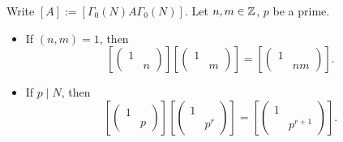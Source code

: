 \begin{proposition}\label{multiplication formula for diag (1 n)}
    Write $[A] := [\Gamma_0(N) A\Gamma_0(N)]$. Let $n, m\in\mathbb{Z}$, $p$ be a prime.
    \begin{itemize}
        \item If $(n, m) = 1$, then \[\left[ \begin{pmatrix}
            1&\\ & n
        \end{pmatrix} \right]\left[ \begin{pmatrix}
            1&\\ & m
        \end{pmatrix} \right] = \left[ \begin{pmatrix}
            1&\\ & nm
        \end{pmatrix} \right].\]
        \item If $p\mid N$, then
        \[\left[ \begin{pmatrix}
            1&\\ & p
        \end{pmatrix} \right]\left[ \begin{pmatrix}
            1&\\ & p^r
        \end{pmatrix} \right] = \left[ \begin{pmatrix}
            1&\\ & p^{r+1}
        \end{pmatrix} \right].\]


\end{itemize}
\end{proposition}
